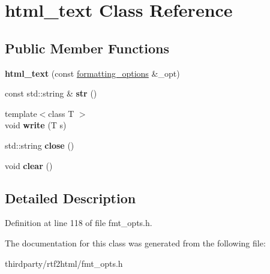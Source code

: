 \hypertarget{classhtml__text}{}\section{html\+\_\+text Class Reference}
\label{classhtml__text}
\subsection*{Public Member Functions}
\begin{DoxyCompactItemize}
\item 
\mbox{\label{classhtml__text_a63526d1744850cb760f1aa45716d475e}} 
{\bfseries html\+\_\+text} (const \hyperlink{structformatting__options}{formatting\+\_\+options} \&\+\_\+opt)
\item 
\mbox{\label{classhtml__text_a1bceef6c6866e697e674fbb5ccfe184d}} 
const std\+::string \& {\bfseries str} ()
\item 
\mbox{\label{classhtml__text_ab08cb3406ab4397863fa922d99912ca0}} 
{\footnotesize template$<$class T $>$ }\\void {\bfseries write} (T s)
\item 
\mbox{\label{classhtml__text_a3e6b1ba7c0d54bb5d44ddcb2d1363c61}} 
std\+::string {\bfseries close} ()
\item 
\mbox{\label{classhtml__text_a11e9545815b79d8f16578f7739d10cf4}} 
void {\bfseries clear} ()
\end{DoxyCompactItemize}


\subsection{Detailed Description}


Definition at line 118 of file fmt\+\_\+opts.\+h.



The documentation for this class was generated from the following file\+:\begin{DoxyCompactItemize}
\item 
thirdparty/rtf2html/fmt\+\_\+opts.\+h\end{DoxyCompactItemize}
